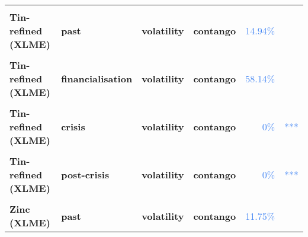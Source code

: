 \documentclass[
  authoryear,
  preprint,
  3p]{elsarticle}
\begin{document}
\begin{longtable}[t]{>{}l>{}l>{}l>{}l>{}r>{}r}
\textbf{\cellcolor{gray!10}{Tin-refined (XLME)}} & \textbf{\cellcolor{gray!10}{past}} & \textbf{\cellcolor{gray!10}{mean}} & \textbf{\cellcolor{gray!10}{backwardation}} & \textcolor[HTML]{4285f4}{\cellcolor{gray!10}{5.22\%}} & \textcolor[HTML]{4285f4}{\cellcolor{gray!10}{*}}\\
\addlinespace
\textbf{Tin-refined (XLME)} & \textbf{past} & \textbf{volatility} & \textbf{contango} & \textcolor[HTML]{4285f4}{14.94\%} & \textcolor[HTML]{4285f4}{}\\
\textbf{\cellcolor{gray!10}{Tin-refined (XLME)}} & \textbf{\cellcolor{gray!10}{financialisation}} & \textbf{\cellcolor{gray!10}{mean}} & \textbf{\cellcolor{gray!10}{backwardation}} & \textcolor[HTML]{4285f4}{\cellcolor{gray!10}{70.17\%}} & \textcolor[HTML]{4285f4}{\cellcolor{gray!10}{}}\\
\textbf{Tin-refined (XLME)} & \textbf{financialisation} & \textbf{volatility} & \textbf{contango} & \textcolor[HTML]{4285f4}{58.14\%} & \textcolor[HTML]{4285f4}{}\\
\textbf{\cellcolor{gray!10}{Tin-refined (XLME)}} & \textbf{\cellcolor{gray!10}{crisis}} & \textbf{\cellcolor{gray!10}{mean}} & \textbf{\cellcolor{gray!10}{backwardation}} & \textcolor[HTML]{4285f4}{\cellcolor{gray!10}{34.29\%}} & \textcolor[HTML]{4285f4}{\cellcolor{gray!10}{}}\\
\textbf{Tin-refined (XLME)} & \textbf{crisis} & \textbf{volatility} & \textbf{contango} & \textcolor[HTML]{4285f4}{0\%} & \textcolor[HTML]{4285f4}{***}\\
\addlinespace
\textbf{\cellcolor{gray!10}{Tin-refined (XLME)}} & \textbf{\cellcolor{gray!10}{post-crisis}} & \textbf{\cellcolor{gray!10}{mean}} & \textbf{\cellcolor{gray!10}{backwardation}} & \textcolor[HTML]{4285f4}{\cellcolor{gray!10}{73.44\%}} & \textcolor[HTML]{4285f4}{\cellcolor{gray!10}{}}\\
\textbf{Tin-refined (XLME)} & \textbf{post-crisis} & \textbf{volatility} & \textbf{contango} & \textcolor[HTML]{4285f4}{0\%} & \textcolor[HTML]{4285f4}{***}\\
\textbf{\cellcolor{gray!10}{Zinc (XLME)}} & \textbf{\cellcolor{gray!10}{past}} & \textbf{\cellcolor{gray!10}{mean}} & \textbf{\cellcolor{gray!10}{contango}} & \textcolor[HTML]{4285f4}{\cellcolor{gray!10}{59.39\%}} & \textcolor[HTML]{4285f4}{\cellcolor{gray!10}{}}\\
\textbf{Zinc (XLME)} & \textbf{past} & \textbf{volatility} & \textbf{contango} & \textcolor[HTML]{4285f4}{11.75\%} & \textcolor[HTML]{4285f4}{}\\

\end{longtable}
\end{document}
